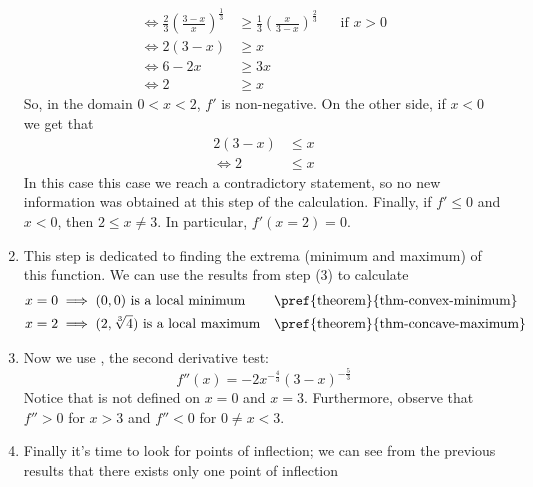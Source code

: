 \begin{exm}
\begin{flushleft}
\begin{enumerate}
\begin{align*}
				      \iff
				      \frac{2}{3}\left(\frac{3-x}{x}\right)^{\frac{1}{3}} & \geq \frac{1}{3}\left(\frac{x}{3-x}\right)^{\frac{2}{3}} &  & \text{if }x>0 \\
				      \iff
				      2(3-x)                                              & \geq x                                                                      \\
				      \iff
				      6-2x                                                & \geq 3x                                                                     \\
				      \iff
				      2                                                   & \geq x
			      \end{align*}
			      So, in the domain $0<x<2$, $f'$ is non-negative. On the other side,
			      if $x<0$ we get that
			      \begin{align*}
				      2(3-x) & \leq x \\
				      \iff
				      2      & \leq x
			      \end{align*}
			      In this case this case we reach a contradictory statement, so no new
			      information was obtained at this step of the calculation. Finally, if
			      $f' \leq 0$ and $x < 0$, then $2 \leq x \neq 3$. In particular, $f'(x=2)=0$.
			\item This step is dedicated to finding the extrema (minimum and maximum)
			      of this function. We can use the results from step (3) to calculate
			      \begin{align*}
				       & x=0 \implies (0,0) \text{ is a local minimum}          &  & \text{\pref{theorem}{thm-convex-minimum}}  \\
				       & x=2 \implies (2,\sqrt[3]{4})\text{ is a local maximum} &  & \text{\pref{theorem}{thm-concave-maximum}}
			      \end{align*}
			\item Now we use , the second derivative test:
			      \begin{equation}\label{eq-curve-sketching:4}
				      f''(x) = -2x^{-\frac{4}{3}}(3-x)^{-\frac{5}{3}}
			      \end{equation}
			      Notice that  is not defined on $x = 0$
			      and $x = 3$. Furthermore, observe that $f'' > 0$ for $x > 3$ and $f'' < 0$ for
			      $0 \neq x < 3$.
			\item Finally it's time to look for points of inflection; we can see
			      from the previous results that there exists only one point of inflection

\end{enumerate}
\end{flushleft}
\end{exm}
